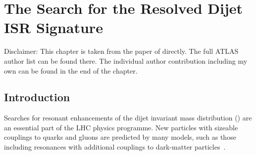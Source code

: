 
\chapter{The Search for the Resolved Dijet ISR Signature}
\label{chapter:dijet}

Disclaimer:
This chapter is taken from the paper of \cite{2019} directly.
The full ATLAS author list can be found there. The individual author contribution including my own can be found in the end of the chapter.

%

\section{Introduction}

\let\oldTeV\TeV
\let\oldGeV\GeV
\renewcommand{\TeV}{\oldTeV\xspace}
\renewcommand{\GeV}{\oldGeV\xspace}

\newcommand{\PhotonGaussianLimitStatement}{from approximately 100--150~fb at a mean mass of 200~\GeV to approximately 10--20~fb at 1.2~\TeV}
\newcommand{\JetGaussianLimitStatement}{from approximately 100~fb at a mean mass of 350~\GeV to approximately 50~fb at 550~\GeV}
\newcommand{\JetZprimeLimitStatement}{\textbf{To be updated} for $\gq$ above 0.20 at mass $m_{\Zprime}=350$~\GeV and $\gq$ above 0.22 at $m_{\Zprime}=550$~\GeV}

Searches for resonant enhancements of the dijet invariant mass distribution (\mjj) are an essential part of the LHC physics programme.
New particles with sizeable couplings to quarks and gluons are predicted by many models, such as those including resonances with additional couplings to dark-matter particles~\cite{Chala:2015ama,LHCDMF:2015}.

